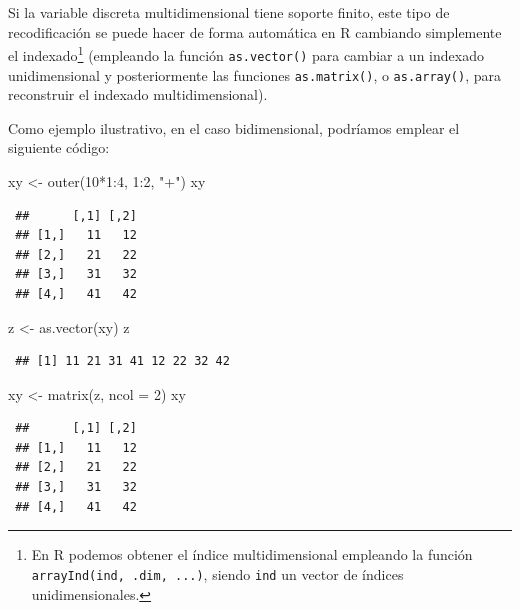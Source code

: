 \documentclass[
]{book}
\newenvironment{Shaded}{\begin{snugshade}}{\end{snugshade}}
\newcommand{\AttributeTok}[1]{\textcolor[rgb]{0.77,0.63,0.00}{#1}}
\newcommand{\DecValTok}[1]{\textcolor[rgb]{0.00,0.00,0.81}{#1}}
\newcommand{\FunctionTok}[1]{\textcolor[rgb]{0.00,0.00,0.00}{#1}}
\newcommand{\NormalTok}[1]{#1}
\newcommand{\OtherTok}[1]{\textcolor[rgb]{0.56,0.35,0.01}{#1}}
\newcommand{\SpecialCharTok}[1]{\textcolor[rgb]{0.00,0.00,0.00}{#1}}
\newcommand{\StringTok}[1]{\textcolor[rgb]{0.31,0.60,0.02}{#1}}
\theoremstyle{break}
\theoremstyle{nonumberplain}
\begin{document}
Si la variable discreta multidimensional tiene soporte finito, este tipo de recodificación se puede hacer de forma automática en R cambiando simplemente el indexado\footnote{En R podemos obtener el índice multidimensional empleando la función \texttt{arrayInd(ind,\ .dim,\ ...)}, siendo \texttt{ind} un vector de índices unidimensionales.} (empleando la función \texttt{as.vector()} para cambiar a un indexado unidimensional y posteriormente las funciones \texttt{as.matrix()}, o \texttt{as.array()}, para reconstruir el indexado multidimensional).

Como ejemplo ilustrativo, en el caso bidimensional, podríamos emplear el siguiente código:

\begin{Shaded}
\begin{Highlighting}[]
\NormalTok{xy }\OtherTok{\textless{}{-}} \FunctionTok{outer}\NormalTok{(}\DecValTok{10}\SpecialCharTok{*}\DecValTok{1}\SpecialCharTok{:}\DecValTok{4}\NormalTok{, }\DecValTok{1}\SpecialCharTok{:}\DecValTok{2}\NormalTok{, }\StringTok{"+"}\NormalTok{)}
\NormalTok{xy}
\end{Highlighting}
\end{Shaded}

\begin{verbatim}
 ##      [,1] [,2]
 ## [1,]   11   12
 ## [2,]   21   22
 ## [3,]   31   32
 ## [4,]   41   42
\end{verbatim}

\begin{Shaded}
\begin{Highlighting}[]
\NormalTok{z }\OtherTok{\textless{}{-}} \FunctionTok{as.vector}\NormalTok{(xy)}
\NormalTok{z}
\end{Highlighting}
\end{Shaded}

\begin{verbatim}
 ## [1] 11 21 31 41 12 22 32 42
\end{verbatim}

\begin{Shaded}
\begin{Highlighting}[]
\NormalTok{xy }\OtherTok{\textless{}{-}} \FunctionTok{matrix}\NormalTok{(z, }\AttributeTok{ncol =} \DecValTok{2}\NormalTok{)}
\NormalTok{xy}
\end{Highlighting}
\end{Shaded}

\begin{verbatim}
 ##      [,1] [,2]
 ## [1,]   11   12
 ## [2,]   21   22
 ## [3,]   31   32
 ## [4,]   41   42
\end{verbatim}
\end{document}
